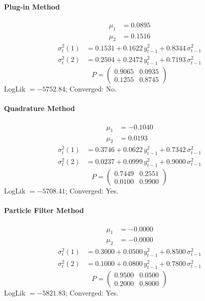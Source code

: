 \documentclass[11pt, a4paper]{article}
\begin{document}
\paragraph{Plug-in Method}
\begin{align}
\mu_{1} &= 0.0895 \\
\mu_{2} &= 0.1516
\end{align}
\begin{align}
\sigma^2_{t}(1) &= 0.1531 + 0.1622\, y_{t-1}^2 + 0.8344\, \sigma^2_{t-1} \\
\sigma^2_{t}(2) &= 0.2504 + 0.2472\, y_{t-1}^2 + 0.7193\, \sigma^2_{t-1}
\end{align}
\begin{equation}
P = \begin{pmatrix} 0.9065 & 0.0935 \\ 0.1255 & 0.8745 \end{pmatrix}
\end{equation}
LogLik $= -5752.84$; Converged: No.

\paragraph{Quadrature Method}
\begin{align}
\mu_{1} &= -0.1040 \\
\mu_{2} &= 0.0193
\end{align}
\begin{align}
\sigma^2_{t}(1) &= 0.3746 + 0.0622\, y_{t-1}^2 + 0.7342\, \sigma^2_{t-1} \\
\sigma^2_{t}(2) &= 0.0237 + 0.0999\, y_{t-1}^2 + 0.9000\, \sigma^2_{t-1}
\end{align}
\begin{equation}
P = \begin{pmatrix} 0.7449 & 0.2551 \\ 0.0100 & 0.9900 \end{pmatrix}
\end{equation}
LogLik $= -5708.41$; Converged: Yes.

\paragraph{Particle Filter Method}
\begin{align}
\mu_{1} &= -0.0000 \\
\mu_{2} &= -0.0000
\end{align}
\begin{align}
\sigma^2_{t}(1) &= 0.3000 + 0.0500\, y_{t-1}^2 + 0.8500\, \sigma^2_{t-1} \\
\sigma^2_{t}(2) &= 0.1000 + 0.0800\, y_{t-1}^2 + 0.7800\, \sigma^2_{t-1}
\end{align}
\begin{equation}
P = \begin{pmatrix} 0.9500 & 0.0500 \\ 0.2000 & 0.8000 \end{pmatrix}
\end{equation}
LogLik $= -5821.83$; Converged: Yes.
\end{document}

